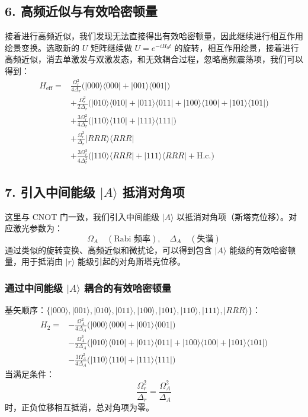 \documentclass[12pt]{article}
\begin{document}
	\subsection*{6. 高频近似与有效哈密顿量}
	接着进行高频近似，我们发现无法直接得出有效哈密顿量，因此继续进行相互作用绘景变换。选取新的 $U$ 矩阵继续做 $U = e^{-i H_0 t}$ 的旋转，相互作用绘景，接着进行高频近似，消去单激发与双激发态，和无效耦合过程，忽略高频震荡项，我们可以得到：
	\begin{equation}
		\begin{aligned}
			H_{\text{eff}} = &\frac{\Omega_r^2}{4\Delta_r} \big( |000\rangle\langle 000| + |001\rangle\langle 001| \big) \\
			&+ \frac{\Omega_r^2}{2\Delta_r} \big( |010\rangle\langle 010| + |011\rangle\langle 011| + |100\rangle\langle 100| + |101\rangle\langle 101| \big) \\
			&+ \frac{3\Omega_r^2}{4\Delta_r} \big( |110\rangle\langle 110| + |111\rangle\langle 111| \big) \\
			&+ \frac{\Omega_r^2}{\Delta_r} |RRR\rangle\langle RRR| \\
			&+ \frac{3\Omega_r^3}{4\Delta_r^2} \big( |110\rangle\langle RRR| + |111\rangle\langle RRR| + \mathrm{H.c.} \big)
		\end{aligned}
	\end{equation}
	
	\subsection*{7. 引入中间能级 $|A\rangle$ 抵消对角项}
	这里与 CNOT 门一致，我们引入中间能级 $|A\rangle$ 以抵消对角项（斯塔克位移）。对应激光参数为：
	\begin{equation}
		\Omega_A \quad (\text{Rabi 频率}), \quad \Delta_A \quad (\text{失谐})
	\end{equation}
	通过类似的旋转变换、高频近似和微扰论，可以得到包含 $|A\rangle$ 能级的有效哈密顿量，用于抵消由 $|r\rangle$ 能级引起的对角斯塔克位移。
	
	\subsubsection*{通过中间能级 $|A\rangle$ 耦合的有效哈密顿量}
	基矢顺序：$\{|000\rangle, |001\rangle, |010\rangle, |011\rangle, |100\rangle, |101\rangle, |110\rangle, |111\rangle, |RRR\rangle\}$：
	\begin{equation}
		\begin{aligned}
			H_2 = &-\frac{\Omega_A^2}{4\Delta_A} \big( |000\rangle\langle 000| + |001\rangle\langle 001| \big) \\
			&-\frac{\Omega_A^2}{2\Delta_A} \big( |010\rangle\langle 010| + |011\rangle\langle 011| + |100\rangle\langle 100| + |101\rangle\langle 101| \big) \\
			&-\frac{3\Omega_A^2}{4\Delta_A} \big( |110\rangle\langle 110| + |111\rangle\langle 111| \big)
		\end{aligned}
	\end{equation}
	当满足条件：
	\begin{equation}
		\frac{\Omega_r^2}{\Delta_r} = \frac{\Omega_A^2}{\Delta_A}
	\end{equation}
	时，正负位移相互抵消，总对角项为零。
	
\end{document}
